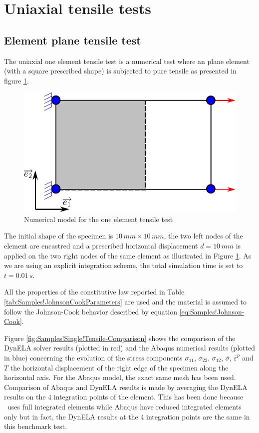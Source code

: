 \section{Uniaxial tensile tests}

\subsection{Element plane tensile test}

The uniaxial one element tensile test is a numerical test where an
plane element (with a square prescribed shape) is subjected to pure
tensile as presented in figure \ref{fig:Samples!Single!Tensile}.
\begin{figure}[h]
\begin{centering}
\includegraphics[width=0.5\columnwidth]{Figures/SamplesSingleTensile}
\par\end{centering}
\caption{Numerical model for the one element tensile test\label{fig:Samples!Single!Tensile}}
\end{figure}
 The initial shape of the specimen is $10\,mm\times10\,mm$, the two
left nodes of the element are encastred and a prescribed horizontal
displacement $d=10\,mm$ is applied on the two right nodes of the
same element as illustrated in Figure \ref{fig:Samples!Single!Tensile}.
As we are using an explicit integration scheme, the total simulation
time is set to $t=0.01\,s$. 

All the properties of the constitutive law reported in Table \ref{tab:Samples!JohnsonCookParameters}
are used and the material is assumed to follow the Johnson-Cook behavior
described by equation \ref{eq:Samples!Johnson-Cook}.

Figure \ref{fig:Samples!Single!Tensile-Comparison} shows the comparison
of the DynELA solver results (plotted in red) and the Abaqus numerical
results (plotted in blue) concerning the evolution of the stress components
$\sigma_{11}$, $\sigma_{22}$, $\sigma_{12}$, $\overline{\sigma}$,
$\overline{\varepsilon}^{p}$ and $T$ \versus  the horizontal displacement
of the right edge of the specimen along the horizontal axis. For the
Abaqus model, the exact same mesh has been used. Comparison of Abaqus
and DynELA results is made by averaging the DynELA results on the
$4$ integration points of the element. This has been done because
\DynELA~uses full integrated elements while Abaqus have reduced
integrated elements only but in fact, the DynELA results at the $4$
integration points are the same in this benchmark test.

